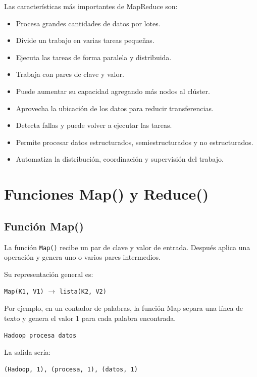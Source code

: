 Las características más importantes de MapReduce son:

\begin{itemize}
    \item Procesa grandes cantidades de datos por lotes.
    \item Divide un trabajo en varias tareas pequeñas.
    \item Ejecuta las tareas de forma paralela y distribuida.
    \item Trabaja con pares de clave y valor.
    \item Puede aumentar su capacidad agregando más nodos al clúster.
    \item Aprovecha la ubicación de los datos para reducir transferencias.
    \item Detecta fallas y puede volver a ejecutar las tareas.
    \item Permite procesar datos estructurados, semiestructurados y no
    estructurados.
    \item Automatiza la distribución, coordinación y supervisión del trabajo.
\end{itemize}

\section{Funciones Map() y Reduce()}

\subsection*{Función Map()}

La función \texttt{Map()} recibe un par de clave y valor de entrada. Después
aplica una operación y genera uno o varios pares intermedios.

Su representación general es:

\begin{center}
\texttt{Map(K1, V1)} $\longrightarrow$ \texttt{lista(K2, V2)}
\end{center}

Por ejemplo, en un contador de palabras, la función Map separa una línea de
texto y genera el valor 1 para cada palabra encontrada.

\begin{center}
\texttt{Hadoop procesa datos}
\end{center}

La salida sería:

\begin{center}
\texttt{(Hadoop, 1), (procesa, 1), (datos, 1)}
\end{center}

